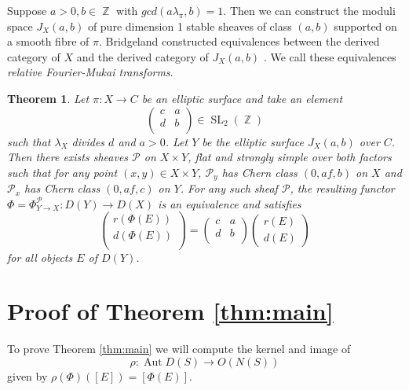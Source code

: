 \documentclass[a4paper, 12pt, twoside]{amsart}
\theoremstyle{plain}
\newtheorem{theorem}{Theorem}[section]
\theoremstyle{definition}
\DeclareMathOperator{\Aut}{Aut}
\DeclareMathOperator{\Z}{\mathbb{Z}}
\DeclareMathOperator{\SL}{SL}
\begin{document}
Suppose $a >0, b \in \Z$ with $gcd(a \lambda_{\pi},b)=1$.  Then we can
construct the moduli space $J_X(a,b)$ of pure dimension 1 stable
sheaves of class $(a,b)$ supported on a smooth fibre of $\pi$.
Bridgeland constructed equivalences between the derived category of
$X$ and the derived category of $J_X(a,b)$ \cite{MR1629929}. We call
these equivalences \emph{relative Fourier-Mukai transforms}.

\begin{theorem}\label{thm:relative-fm}{\cite[Theorem
    5.3]{MR1629929}} Let $\pi \colon X \to C$ be an elliptic surface
  and take an element
 \[ 
   \begin{pmatrix}
     c & a\\
     d & b\\
   \end{pmatrix} 
   \in \SL_2(\Z)
\] 
such that $\lambda_X$ divides $d$ and $a>0$. Let $Y$ be the elliptic
surface $J_X(a,b)$ over $C$. Then there exists sheaves $\mathcal{P}$
on $X \times Y$, flat and strongly simple over both factors such that
for any point $(x,y) \in X \times Y$, $\mathcal{P}_y$ has Chern class
$(0,af,b)$ on $X$ and $\mathcal{P}_x$ has Chern class $(0,af,c)$ on
$Y$. For any such sheaf $\mathcal{P}$, the resulting functor
$\Phi = \Phi^{\mathcal{P}}_{Y \to X} \colon D(Y) \to D(X)$ is an
equivalence and satisfies
\begin{equation*}
\begin{pmatrix}
  r(\Phi(E))\\
  d(\Phi(E))\\
  \end{pmatrix}
=
\begin{pmatrix}
  c & a\\
  d & b\\
\end{pmatrix}
\begin{pmatrix}
  r(E)\\
  d(E)
\end{pmatrix}
\end{equation*}
for all objects $E$ of $D(Y)$.  
\end{theorem}


\section{Proof of Theorem \ref{thm:main}}
\label{sec:proof}

To prove Theorem \ref{thm:main} we will compute the kernel and image of
\[
  \rho \colon \Aut D(S) \to O(N(S))
\] 
given by $\rho(\Phi)([E])= [\Phi(E)]$.
\end{document}

